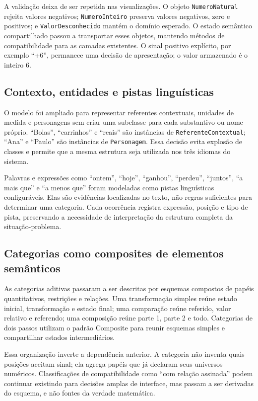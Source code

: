 \documentclass[preprint,12pt,authoryear]{elsarticle}
\begin{document}
A validação deixa de ser repetida nas visualizações. O objeto \texttt{NumeroNatural} rejeita valores negativos; \texttt{NumeroInteiro} preserva valores negativos, zero e positivos; e \texttt{ValorDesconhecido} mantém o domínio esperado. O estado semântico compartilhado passou a transportar esses objetos, mantendo métodos de compatibilidade para as camadas existentes. O sinal positivo explícito, por exemplo ``+6'', permanece uma decisão de apresentação; o valor armazenado é o inteiro 6.

\subsection{Contexto, entidades e pistas linguísticas}

O modelo foi ampliado para representar referentes contextuais, unidades de medida e personagens sem criar uma subclasse para cada substantivo ou nome próprio. ``Bolas'', ``carrinhos'' e ``reais'' são instâncias de \texttt{ReferenteContextual}; ``Ana'' e ``Paulo'' são instâncias de \texttt{Personagem}. Essa decisão evita explosão de classes e permite que a mesma estrutura seja utilizada nos três idiomas do sistema.

Palavras e expressões como ``ontem'', ``hoje'', ``ganhou'', ``perdeu'', ``juntos'', ``a mais que'' e ``a menos que'' foram modeladas como pistas linguísticas configuráveis. Elas são evidências localizadas no texto, não regras suficientes para determinar uma categoria. Cada ocorrência registra expressão, posição e tipo de pista, preservando a necessidade de interpretação da estrutura completa da situação-problema.

\subsection{Categorias como composites de elementos semânticos}

As categorias aditivas passaram a ser descritas por esquemas compostos de papéis quantitativos, restrições e relações. Uma transformação simples reúne estado inicial, transformação e estado final; uma comparação reúne referido, valor relativo e referendo; uma composição reúne parte 1, parte 2 e todo. Categorias de dois passos utilizam o padrão Composite para reunir esquemas simples e compartilhar estados intermediários.

Essa organização inverte a dependência anterior. A categoria não inventa quais posições aceitam sinal; ela agrega papéis que já declaram seus universos numéricos. Classificações de compatibilidade como ``com relação assinada'' podem continuar existindo para decisões amplas de interface, mas passam a ser derivadas do esquema, e não fontes da verdade matemática.
\end{document}
